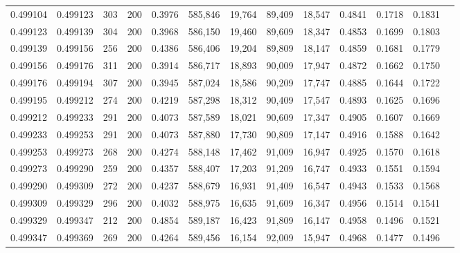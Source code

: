 \begin{tabular}{rrrrrrrrrrrrr}
0.499104 & 0.499123 &    303 & 200 &                                     0.3976 & 585,846 &  19,764 &  89,409 &  18,547 & 0.4841 & 0.1718 & 0.1831 \\
0.499123 & 0.499139 &    304 & 200 &                                     0.3968 & 586,150 &  19,460 &  89,609 &  18,347 & 0.4853 & 0.1699 & 0.1803 \\
0.499139 & 0.499156 &    256 & 200 &                                     0.4386 & 586,406 &  19,204 &  89,809 &  18,147 & 0.4859 & 0.1681 & 0.1779 \\
0.499156 & 0.499176 &    311 & 200 &                                     0.3914 & 586,717 &  18,893 &  90,009 &  17,947 & 0.4872 & 0.1662 & 0.1750 \\
0.499176 & 0.499194 &    307 & 200 &                                     0.3945 & 587,024 &  18,586 &  90,209 &  17,747 & 0.4885 & 0.1644 & 0.1722 \\
0.499195 & 0.499212 &    274 & 200 &                                     0.4219 & 587,298 &  18,312 &  90,409 &  17,547 & 0.4893 & 0.1625 & 0.1696 \\
0.499212 & 0.499233 &    291 & 200 &                                     0.4073 & 587,589 &  18,021 &  90,609 &  17,347 & 0.4905 & 0.1607 & 0.1669 \\
0.499233 & 0.499253 &    291 & 200 &                                     0.4073 & 587,880 &  17,730 &  90,809 &  17,147 & 0.4916 & 0.1588 & 0.1642 \\
0.499253 & 0.499273 &    268 & 200 &                                     0.4274 & 588,148 &  17,462 &  91,009 &  16,947 & 0.4925 & 0.1570 & 0.1618 \\
0.499273 & 0.499290 &    259 & 200 &                                     0.4357 & 588,407 &  17,203 &  91,209 &  16,747 & 0.4933 & 0.1551 & 0.1594 \\
0.499290 & 0.499309 &    272 & 200 &                                     0.4237 & 588,679 &  16,931 &  91,409 &  16,547 & 0.4943 & 0.1533 & 0.1568 \\
0.499309 & 0.499329 &    296 & 200 &                                     0.4032 & 588,975 &  16,635 &  91,609 &  16,347 & 0.4956 & 0.1514 & 0.1541 \\
0.499329 & 0.499347 &    212 & 200 &                                     0.4854 & 589,187 &  16,423 &  91,809 &  16,147 & 0.4958 & 0.1496 & 0.1521 \\
0.499347 & 0.499369 &    269 & 200 &                                     0.4264 & 589,456 &  16,154 &  92,009 &  15,947 & 0.4968 & 0.1477 & 0.1496 \\

\end{tabular}
